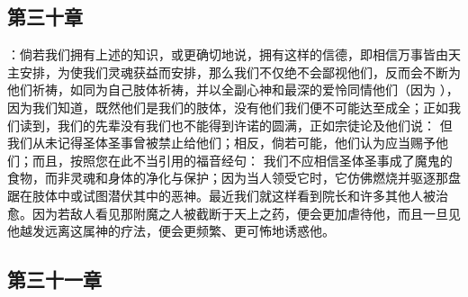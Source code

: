 \subsection{第三十章}

\par

：倘若我们拥有上述的知识，或更确切地说，拥有这样的信德，即相信万事皆由天主安排，为使我们灵魂获益而安排，那么我们不仅绝不会鄙视他们，反而会不断为他们祈祷，如同为自己肢体祈祷，并以全副心神和最深的爱怜同情他们（因为 ），因为我们知道，既然他们是我们的肢体，没有他们我们便不可能达至成全；正如我们读到，我们的先辈没有我们也不能得到许诺的圆满，正如宗徒论及他们说：  但我们从未记得圣体圣事曾被禁止给他们；相反，倘若可能，他们认为应当赐予他们；而且，按照您在此不当引用的福音经句：  我们不应相信圣体圣事成了魔鬼的食物，而非灵魂和身体的净化与保护；因为当人领受它时，它仿佛燃烧并驱逐那盘踞在肢体中或试图潜伏其中的恶神。最近我们就这样看到院长和许多其他人被治愈。因为若敌人看见那附魔之人被截断于天上之药，便会更加虐待他，而且一旦见他越发远离这属神的疗法，便会更频繁、更可怖地诱惑他。\par


\subsection{第三十一章}

\par

